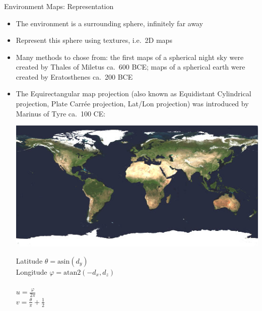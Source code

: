 \documentclass[utf8,stillsansserifmath,fleqn,t]{beamer}
\newcommand{\ds}{\displaystyle}
\begin{document}
\begin{frame}[label=envmap-equirect]
\frametitle{\insertsection}
Environment Maps: Representation
\begin{itemize}
\item The environment is a surrounding sphere, infinitely far away
\item Represent this sphere using textures, i.e.~2D maps
\item Many methods to chose from: the first maps of a spherical night sky
were created by Thales of Miletus ca.~600 BCE; maps of a spherical earth
were created by Eratosthenes ca.~200 BCE\
\item The Equirectangular map projection (also known as Equidistant Cylindrical
projection, Plate Carrée projection, Lat/Lon projection) was introduced by
Marinus of Tyre ca.~100 CE:\\
\begin{minipage}{.45\textwidth}
\includegraphics[width=\textwidth]{./fig/envmap-equirect-world.jpg}
\end{minipage}\hfill
\begin{minipage}{.45\textwidth}
Latitude $\theta=\text{asin}(d_y)$\\%
Longitude $\varphi=\text{atan2}(-d_x,d_z)$\\ %
~\\
$\ds u = \frac{\varphi}{2\pi}$\\ %
$\ds v = \frac{\theta}{\pi} + \frac{1}{2}$\\ %
\end{minipage}
\end{itemize}
\end{frame}
\end{document}
